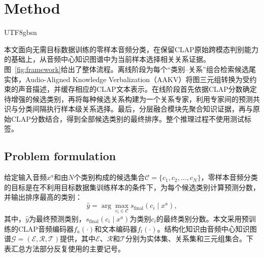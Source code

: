 \providecommand{\methodrevision}[1]{#1}
\section{Method}\label{sec:method}
\begin{CJK*}{UTF8}{gbsn}

本文面向无需目标数据训练的零样本音频分类，在保留CLAP原始跨模态判别能力的基础上，从音频中心知识图谱中为当前样本选择相关关系证据。图~\ref{fig:framework}给出了整体流程。离线阶段为每个“类别--关系”组合检索候选尾实体，Audio-Aligned Knowledge Verbalization（AAKV）将图三元组转换为受约束的声音描述，并缓存相应的CLAP文本表示。在线阶段首先依据CLAP分数确定待增强的候选类别，再将每种候选关系构建为一个关系专家，利用专家间的预测共识与分类间隔执行样本级关系选择。最后，分层融合模块先聚合知识证据，再与原始CLAP分数结合，得到全部候选类别的最终排序。整个推理过程不使用测试标签。


\subsection{Problem formulation}\label{sec:problem-formulation}

给定输入音频$x^a$和由$N$个类别构成的候选集合$\mathcal C=\{c_1,c_2,\ldots,c_N\}$，零样本音频分类的目标是在不利用目标数据集训练样本的条件下，为每个候选类别计算预测分数，并输出排序最高的类别：
\begin{equation}
\hat y=\arg\max_{c_i\in\mathcal C}s_{\mathrm{final}}(c_i\mid x^a),
\label{eq:prediction}
\end{equation}
其中，$\hat y$为最终预测类别，$s_{\mathrm{final}}(c_i\mid x^a)$为类别$c_i$的\methodrevision{最终类别分数}。本文采用预训练的CLAP音频编码器$f_a(\cdot)$和文本编码器$f_t(\cdot)$。结构化知识由音频中心知识图谱$\mathcal G=(\mathcal E,\mathcal R,\mathcal T)$提供，其中$\mathcal E$、$\mathcal R$和$\mathcal T$分别为实体集、关系集和三元组集合。\methodrevision{下表汇总方法部分反复使用的主要记号。}


\end{CJK*}
